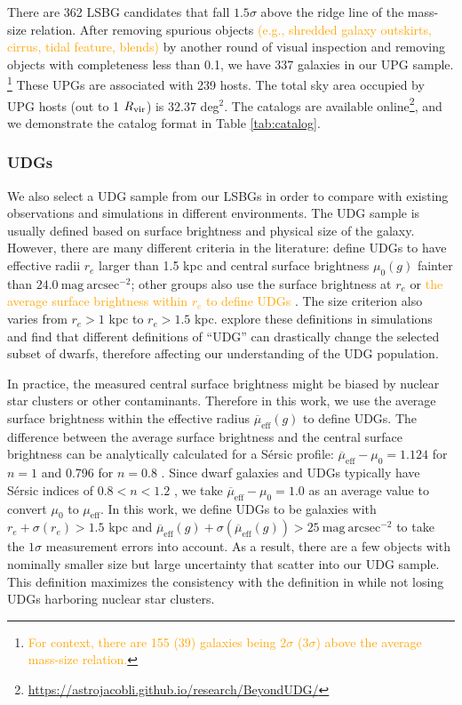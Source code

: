 \documentclass[twocolumn,astrosymb,twocolappendix,linenumbers]{aastex631}
\newcommand{\sbunit}{\mathrm{mag\ arcsec}^{-2}}
\newcommand{\sbeff}{\overline{\mu}_{\mathrm{eff}}(g)}
\newcommand{\emphasize}{\textcolor{orange}}
\newcommand{\sersic}{S\'ersic}
\begin{document}
\begin{CJK*}{UTF8}{gbsn}
There are 362 LSBG candidates that fall $1.5\sigma$ above the ridge line of the mass-size relation. After removing spurious objects \emphasize{(e.g., shredded galaxy outskirts, cirrus, tidal feature, blends)} by another round of visual inspection and removing objects with completeness less than 0.1, we have 337 galaxies in our UPG sample. \footnote{\emphasize{For context, there are 155 (39) galaxies being $2\sigma$ ($3\sigma$) above the average mass-size relation.}} These UPGs are associated with 239 hosts. The total sky area occupied by UPG hosts (out to 1 $R_{\rm{vir}}$) is 32.37 deg$^{2}$. The catalogs are available online\footnote{\url{https://astrojacobli.github.io/research/BeyondUDG/}}, and we demonstrate the catalog format in Table \ref{tab:catalog}. 

\subsubsection{UDGs}
We also select a UDG sample from our LSBGs in order to compare with existing observations and simulations in different environments. The UDG sample is usually defined based on surface brightness and physical size of the galaxy. However, there are many different criteria in the literature: \citet{vanDokkum2015} define UDGs to have effective radii $r_e$ larger than 1.5 kpc and central surface brightness $\mu_0(g)$ fainter than $24.0\ \sbunit$; other groups also use the surface brightness at $r_e$ \citep[e.g.,][]{DiCintio2017,Cardona-Barrero2020} or \emphasize{the average surface brightness within $r_e$ to define UDGs \citep[e.g.,][]{Koda2015,Yagi2016,vdBurg2016,Leisman2017,ManceraPina2018,ManceraPina2019a,Martin2019,Karunakaran2022b}}. The size criterion also varies from $r_e > 1$ kpc to $r_e > 1.5$ kpc. \citet{vanNest2022} explore these definitions in simulations and find that different definitions of ``UDG'' can drastically change the selected subset of dwarfs, therefore affecting our understanding of the UDG population.

In practice, the measured central surface brightness might be biased by nuclear star clusters \citep{Neumayer2020,ELVES-II,Somalwar2020} or other contaminants. Therefore in this work, we use the average surface brightness within the effective radius $\sbeff$ to define UDGs. The difference between the average surface brightness and the central surface brightness can be analytically calculated for a \sersic{} profile: $\overline{\mu}_{\mathrm{eff}} - \mu_0 = 1.124$ for $n=1$ and 0.796 for $n=0.8$ \citep{Graham2005,Yagi2016}. Since dwarf galaxies and UDGs typically have \sersic{} indices of $0.8 < n < 1.2$ \citep[e.g.,][]{vanDokkum2015,ELVES-I}, we take $\overline{\mu}_{\mathrm{eff}} - \mu_0 = 1.0$ as an average value to convert $\mu_0$ to $\mu_{\mathrm{eff}}$. In this work, we define UDGs to be galaxies with $r_e+\sigma(r_e) > 1.5$ kpc and $\sbeff + \sigma(\sbeff) > 25\ \sbunit$ to take the $1\sigma$ measurement errors into account. As a result, there are a few objects with nominally smaller size but large uncertainty that scatter into our UDG sample. This definition maximizes the consistency with the definition in \citet{vanDokkum2015} while not losing UDGs harboring nuclear star clusters.


\end{CJK*}
\end{document}
